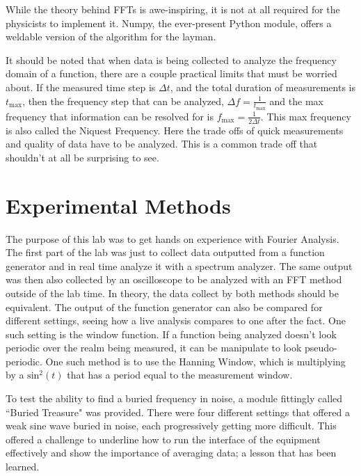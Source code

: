 \documentclass[12pt]{article}
\begin{document}
While the theory behind FFTs is awe-inspiring, it is not at all required for the physicists to implement it. Numpy, the ever-present Python module, offers a weldable version of the algorithm for the layman.
    
It should be noted that when data is being collected to analyze the frequency domain of a function, there are a couple practical limits that must be worried about. If the measured time step is $\Delta t$, and the total duration of measurements is $t_{\text{max}}$, then the frequency step that can be analyzed, $\Delta f = \frac{1}{t_{\text{max}}}$ and the max frequency that information can be resolved for is $f_{\text{max}} = \frac{1}{2 \Delta t}$. This max frequency is also called the Niquest Frequency. Here the trade offs of quick measurements and quality of data have to be analyzed. This is a common trade off that shouldn't at all be surprising to see.
    
\section{Experimental Methods}
    
The purpose of this lab was to get hands on experience with Fourier Analysis. The first part of the lab was just to collect data outputted from a function generator and in real time analyze it with a spectrum analyzer. The same output was then also collected by an oscilloscope to be analyzed with an FFT method outside of the lab time. In theory, the data collect by both methods should be equivalent. The output of the function generator can also be compared for different settings, seeing how a live analysis compares to one after the fact. One such setting is the window function. If a function being analyzed doesn't look periodic over the realm being measured, it can be manipulate to look pseudo-periodic. One such method is to use the Hanning Window, which is multiplying by a $\text{sin}^2(t)$ that has a period equal to the measurement window. 
    
To test the ability to find a buried frequency in noise, a module fittingly called ``Buried Treasure" was provided. There were four different settings that offered a weak sine wave buried in noise, each progressively getting more difficult. This offered a challenge to underline how to run the interface of the equipment effectively and show the importance of averaging data; a lesson that has been learned.
    
\end{document}
